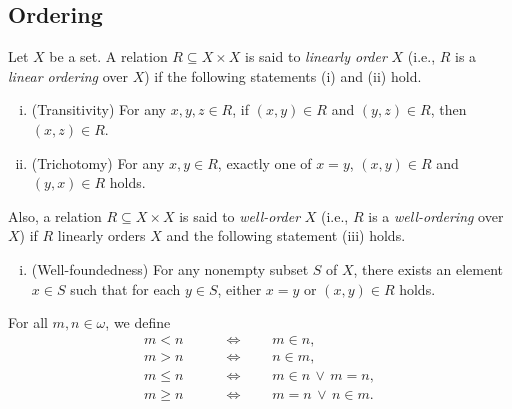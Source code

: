 \documentclass[11pt]{article}
\begin{document}
\subsection{Ordering}
\begin{definition}
  Let $X$ be a set.
  A relation $R \subseteq X \times X$ is said to \emph{linearly order} $X$ (i.e., $R$ is a \emph{linear ordering} over $X$) if the following statements (i) and (ii) hold.
  \begin{enumerate}[(i)]
    \item (Transitivity) For any $x, y, z \in R$, if $(x, y) \in R$ and $(y, z) \in R$, then $(x, z) \in R$.
    \item (Trichotomy) For any $x, y \in R$, exactly one of $x = y$, $(x, y) \in R$ and $(y, x) \in R$ holds.
  \end{enumerate}
  \par Also, a relation $R \subseteq X \times X$ is said to \emph{well-order} $X$ (i.e., $R$ is a \emph{well-ordering} over $X$) if $R$ linearly orders $X$ and the following statement (iii) holds.
  \begin{enumerate}[(i),resume]
    \item (Well-foundedness) For any nonempty subset $S$ of $X$, there exists an element $x \in S$ such that for each $y \in S$, either $x = y$ or $(x, y) \in R$ holds.
  \end{enumerate}
\end{definition}

\begin{definition}
  For all $m, n \in \omega$, we define
  \begin{align*}
    m < n \qquad &\iff \qquad m \in n, \\
    m > n \qquad &\iff \qquad n \in m, \\
    m \leq n \qquad &\iff \qquad m \in n \, \vee \, m = n, \\
    m \geq n \qquad &\iff \qquad m = n \, \vee \, n \in m.
  \end{align*}
\end{definition}
\end{document}
